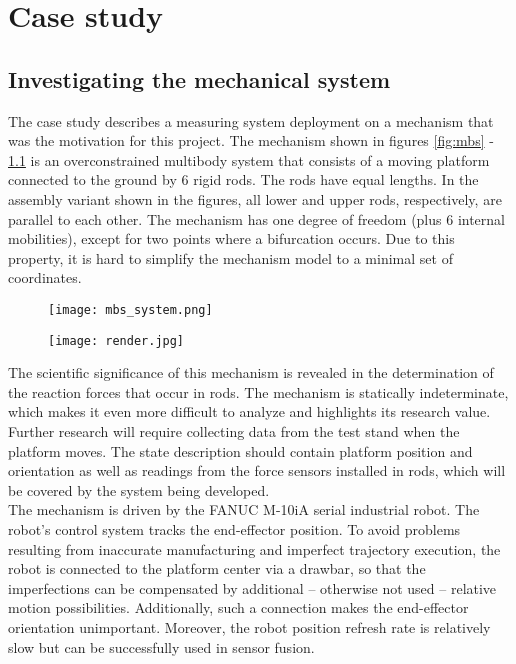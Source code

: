 \chapter{Case study}

\section{Investigating the mechanical system}

The case study describes a measuring system deployment on a mechanism that was the motivation for this project. The mechanism shown in figures \ref{fig:mbs} - \ref{fig:render} is an overconstrained multibody system \cite{bib:BPAS2012} that consists of a moving platform connected to the ground by 6 rigid rods. The rods have equal lengths. In the assembly variant shown in the figures, all lower and upper rods, respectively, are parallel to each other. The mechanism has one degree of freedom (plus 6 internal mobilities), except for two points where a bifurcation occurs. Due to this property, it is hard to simplify the mechanism model to a minimal set of coordinates.

\begin{figure}[!h]
	\centering
	\begin{minipage}{.5\textwidth}
		\centering
		\texttt{[image: mbs\_system.png]}
		\label{fig:mbs}
	\end{minipage}%
	\begin{minipage}{.5\textwidth}
		\centering
		\texttt{[image: render.jpg]}
		\label{fig:render}
	\end{minipage}
\end{figure}

The scientific significance of this mechanism is revealed in the determination of the reaction forces that occur in rods. The mechanism is statically indeterminate, which makes it even more difficult to analyze and highlights its research value. Further research will require collecting data from the test stand when the platform moves. The state description should contain platform position and orientation as well as readings from the force sensors installed in rods, which will be covered by the system being developed.\\

The mechanism is driven by the FANUC M-10iA serial industrial robot. The robot’s control system tracks the end-effector position. To avoid problems resulting from inaccurate manufacturing and imperfect trajectory execution, the robot is connected to the platform center via a drawbar, so that the imperfections can be compensated by additional -- otherwise not used -- relative motion possibilities. Additionally, such a connection makes the end-effector orientation unimportant. Moreover, the robot position refresh rate is relatively slow but can be successfully used in sensor fusion.\\

